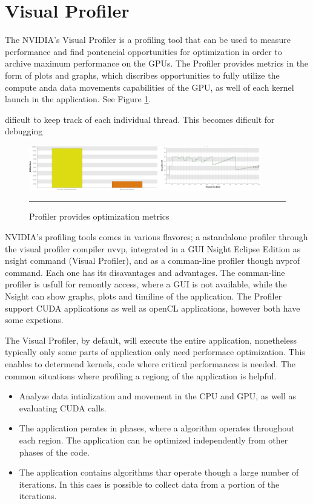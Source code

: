 \section{Visual Profiler}

The NVIDIA's Visual Profiler is a profiling tool that can be used to measure performance and find pontencial opportunities for optimization in order to archive maximum performance on the GPUs. The Profiler provides metrics in the form of plots and graphs, which discribes opportunities to fully utilize the compute anda data movements capabilities of the GPU, as well of each kernel launch in the application. See Figure \ref{fig:visualgraph}.

dificult to keep track of each individual thread. This becomes dificult for debugging 

\begin{figure}[htbp]
	\centering
		\includegraphics[width=0.9\textwidth]{Figures/visualgraph.png}
		\rule{35em}{0.2pt}
	\caption[Visual Profiler metrics graphs and plots]{Profiler provides optimization metrics}
	\label{fig:visualgraph}
\end{figure}

NVIDIA's profiling tools comes in various flavores; a astandalone profiler through the visual profiler compiler nvvp, integrated in a GUI Nsight Eclipse Edition as nsight command (Visual Profiler), and as a comman-line profiler though nvprof command. Each one has its disavantages and advantages. The comman-line profiler is usfull for remontly access, where a GUI is not available, while the Nsight can show graphs, plots and timiline of the application. The Profiler support CUDA applications as well as openCL applications, however both have some expetions. 

The Visual Profiler, by default, will execute the entire application, nonetheless typically only some parts of application only need performace optimization. This enables to determend kernels, code where critical performances is needed. The common situations where profiling a regiong of the application is helpful.\cite{tool}

\begin{itemize}
  \item Analyze data intialization and movement in the CPU and GPU, as well as evaluating CUDA calls.
  \item The application perates in phases, where a algorithm operates throughout each region. The application can be optimized independently from other phases of the code.
  \item The application contains algorithms thar operate though a large number of iterations. In this caes is possible to collect data from a portion of the iterations.
\end{itemize}

